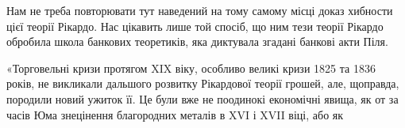 Нам не треба повторювати тут наведений на тому самому місці доказ
хибности цієї теорії Рікардо. Нас цікавить лише той спосіб, що ним тези
теорії Рікардо обробила школа банкових теоретиків, яка диктувала згадані банкові
акти Піля.

«Торговельні кризи протягом XIX віку, особливо великі кризи 1825 та
1836 років, не викликали дальшого розвитку Рікардової теорії грошей, але, щоправда,
породили новий ужиток її. Це були вже не поодинокі економічні явища,
як от за часів Юма знецінення благородних металів в XVI і XVII віці, або як
\parbreak{}  %
